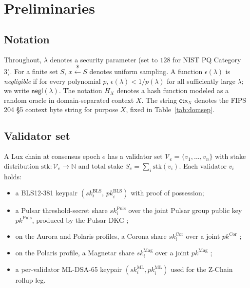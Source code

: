 \section{Preliminaries}
\label{sec:prelim}

\subsection{Notation}

Throughout, $\lambda$ denotes a security parameter (set to $128$ for
NIST PQ Category 3). For a finite set $S$, $x \xleftarrow{\$} S$ denotes
uniform sampling. A function $\epsilon(\lambda)$ is \emph{negligible}
if for every polynomial $p$, $\epsilon(\lambda) < 1/p(\lambda)$ for
all sufficiently large $\lambda$; we write $\mathsf{negl}(\lambda)$.
The notation $H_X$ denotes a hash function modeled as a random oracle
in domain-separated context $X$. The string $\mathsf{ctx}_X$ denotes
the FIPS 204 \S5 context byte string for purpose $X$, fixed in
Table~\ref{tab:domsep}.

\subsection{Validator set}

A Lux chain at consensus epoch $e$ has a validator set
$\mathcal{V}_e = \{v_1, \ldots, v_n\}$ with stake distribution
$\mathrm{stk}: \mathcal{V}_e \to \mathbb{N}$ and total stake
$S_e = \sum_i \mathrm{stk}(v_i)$. Each validator $v_i$ holds:

\begin{itemize}[leftmargin=2em,nosep]
\item a BLS12-381 keypair $(\mathit{sk}_i^{\mathrm{BLS}},\,
      \mathit{pk}_i^{\mathrm{BLS}})$ with proof of possession;
\item a Pulsar threshold-secret share $\mathit{sk}_i^{\mathrm{Puls}}$
      over the joint Pulsar group public key
      $\mathit{pk}^{\mathrm{Puls}}$, produced by the Pulsar DKG
      \cite{pulsar};
\item on the Aurora and Polaris profiles, a Corona share
      $\mathit{sk}_i^{\mathrm{Cor}}$ over a joint
      $\mathit{pk}^{\mathrm{Cor}}$ \cite{corona};
\item on the Polaris profile, a Magnetar share
      $\mathit{sk}_i^{\mathrm{Mag}}$ over a joint
      $\mathit{pk}^{\mathrm{Mag}}$ \cite{magnetar};
\item a per-validator ML-DSA-65 keypair $(\mathit{sk}_i^{\mathrm{ML}},
      \mathit{pk}_i^{\mathrm{ML}})$ used for the Z-Chain rollup leg.
\end{itemize}


